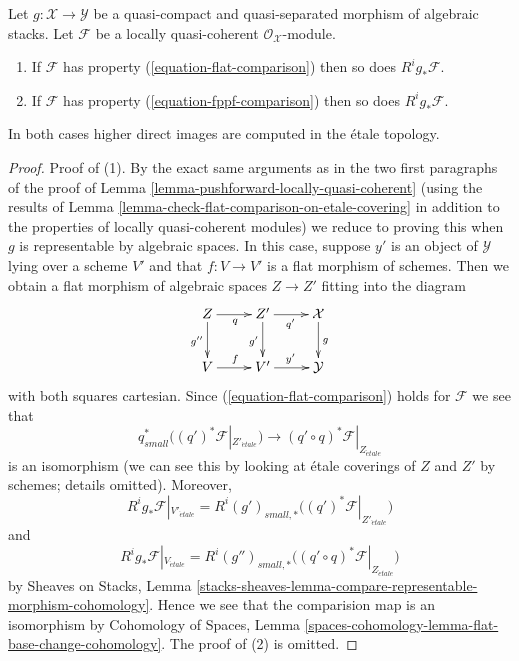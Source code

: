 \begin{lemma}
\label{lemma-flat-comparison}
Let $g : \mathcal{X} \to \mathcal{Y}$ be a quasi-compact and
quasi-separated morphism of algebraic stacks. Let 
$\mathcal{F}$ be a locally quasi-coherent
$\mathcal{O}_\mathcal{X}$-module.
\begin{enumerate}
\item If $\mathcal{F}$ has property (\ref{equation-flat-comparison})
then so does $R^ig_*\mathcal{F}$.
\item If $\mathcal{F}$ has property (\ref{equation-fppf-comparison})
then so does $R^ig_*\mathcal{F}$.
\end{enumerate}
In both cases higher direct images are computed in the \'etale topology.
\end{lemma}

\begin{proof}
Proof of (1). By the exact same arguments as in the two first paragraphs
of the proof of
Lemma \ref{lemma-pushforward-locally-quasi-coherent}
(using the results of
Lemma \ref{lemma-check-flat-comparison-on-etale-covering}
in addition to the properties of locally quasi-coherent modules)
we reduce to proving this when $g$ is representable by algebraic spaces.
In this case, suppose $y'$ is an object of $\mathcal{Y}$ lying over a scheme
$V'$ and that $f : V \to V'$ is a flat morphism of schemes.
Then we obtain a flat morphism of algebraic spaces $Z \to Z'$ fitting
into the diagram
$$
\xymatrix{
Z \ar[d]_{g''} \ar[r]_q & Z' \ar[r]_{q'} \ar[d]_{g'} & \mathcal{X} \ar[d]^g \\
V \ar[r]^f & V' \ar[r]^{y'} & \mathcal{Y}
}
$$
with both squares cartesian. Since
(\ref{equation-flat-comparison}) holds for $\mathcal{F}$ we see that
$$
q_{small}^*\big((q')^*\mathcal{F}|_{Z'_{\acute{e}tale}}\big)
\longrightarrow
(q' \circ q)^*\mathcal{F}|_{Z_{\acute{e}tale}}
$$
is an isomorphism (we can see this by looking at \'etale coverings
of $Z$ and $Z'$ by schemes; details omitted). Moreover,
$$
R^ig_*\mathcal{F}|_{V'_{\acute{e}tale}} =
R^i(g')_{small, *}\big((q')^*\mathcal{F}|_{Z'_{\acute{e}tale}}\big)
$$
and
$$
R^ig_*\mathcal{F}|_{V_{\acute{e}tale}} =
R^i(g'')_{small, *}\big((q' \circ q)^*\mathcal{F}|_{Z_{\acute{e}tale}}\big)
$$
by
Sheaves on Stacks, Lemma
\ref{stacks-sheaves-lemma-compare-representable-morphism-cohomology}.
Hence we see that the comparision map is an isomorphism by
Cohomology of Spaces, Lemma
\ref{spaces-cohomology-lemma-flat-base-change-cohomology}.
The proof of (2) is omitted.
\end{proof}




















